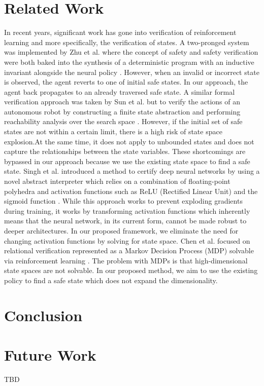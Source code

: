 \documentclass[acmsmall,review,authorversion]{acmart}
\begin{document}
\section{Related Work}
In recent years, significant work has gone into verification of reinforcement learning and more specifically, the verification of states. A two-pronged system was implemented by Zhu et al. where the concept of safety and safety verification were both baked into the synthesis of a deterministic program with an inductive invariant alongside the neural policy \cite{zhu:2019}. However, when an invalid or incorrect state is observed, the agent reverts to one of initial safe states. In our approach, the agent back propagates to an already traversed safe state.
A similar formal verification approach was taken by Sun et al.  but to verify the actions of an autonomous robot by constructing a finite state abstraction and performing reachability analysis over the search space \cite{sun:2019}. However, if the initial set of safe states are not within a certain limit, there is a high risk of state space explosion.At the same time, it does not apply to unbounded states and does not capture the relationships between the state variables. These shortcomings are bypassed in our approach because we use the existing state space to find a safe state. Singh et al. introduced a method to certify deep neural networks by using a novel abstract interpreter which relies on a combination of floating-point polyhedra and activation functions such as ReLU (Rectified Linear Unit) and the sigmoid function \cite{singh:2019}. While this approach works to prevent exploding gradients during training, it works by transforming activation functions which inherently means that the neural network, in its current form, cannot be made robust to deeper architectures. In our proposed framework, we eliminate the need for changing activation functions by solving for state space. Chen et al. focused on relational verification represented as a Markov Decision Process (MDP) solvable via reinforcement learning \cite{chen:2019}. The problem with MDPs is that high-dimensional state spaces are not solvable. In our proposed method, we aim to use the existing policy to find a safe state which does not expand the dimensionality.



\section{Conclusion}

\section{Future Work}
\begin{acks}
TBD
\end{acks}



\end{document}
